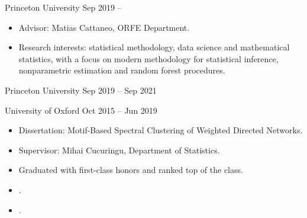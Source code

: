 \documentclass[
  date,
  number,
]{wgu-cv}
\begin{document}
\maketitle

\renewcommand{\natexlab}[1]{}

\setlength{\emergencystretch}{2pt}


{Princeton University}
{Sep 2019 --}

\begin{itemize}
  \item Advisor:
    Matias Cattaneo, ORFE Department.
  \item Research interests:
    statistical methodology,
    data science and
    mathematical statistics,
    with a focus on
    modern methodology for statistical inference,
    nonparametric estimation
    and random forest procedures.
\end{itemize}

{Princeton University}
{Sep 2019 -- Sep 2021}

\bigskip

{University of Oxford}
{Oct 2015 -- Jun 2019}

\begin{itemize}
  \item Dissertation:
    Motif-Based Spectral Clustering of Weighted Directed Networks.
  \item Supervisor:
    Mihai Cucuringu,
    Department of Statistics.
  \item Graduated with first-class honors and ranked top of the class.
\end{itemize}

\vspace*{-4mm}


\begin{itemize}
  \item {}.
  \item {}.
\end{itemize}
\end{document}
